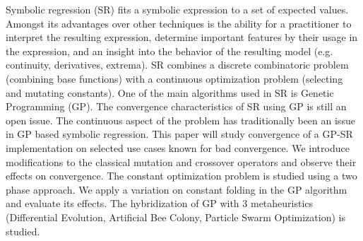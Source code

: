 Symbolic regression (SR) fits a symbolic expression to a set of expected values.
Amongst its advantages over other techniques is the ability for a practitioner to interpret the resulting expression, determine important features by their usage in the expression, and an insight into the behavior of the resulting model (e.g. continuity, derivatives, extrema).
SR combines a discrete combinatoric problem (combining base functions) with a continuous optimization problem (selecting and mutating constants).
One of the main algorithms used in SR is Genetic Programming (GP). The convergence characteristics of SR using GP is still an open issue.
The continuous aspect of the problem has traditionally been an issue in GP based symbolic regression. This paper will study convergence of a GP-SR implementation on selected use cases known for bad convergence.
We introduce modifications to the classical mutation and crossover operators and observe their effects on convergence. 
The constant optimization problem is studied using a two phase approach. We apply a variation on constant folding in the GP algorithm and evaluate its effects. The hybridization of GP with 3 metaheuristics (Differential Evolution, Artificial Bee Colony, Particle Swarm Optimization) is studied. 